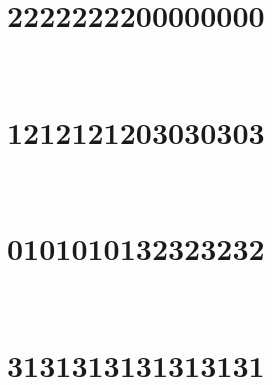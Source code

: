 \marginnote[3\baselineskip]{\centering}



\,
\newline
\vspace{1.2cm}

\section{2222222200000000}

\marginnote[3\baselineskip]{\centering}



\,
\newline
\vspace{1.2cm}

\section{1212121203030303}

\marginnote[3\baselineskip]{\centering}



\,
\newline
\vspace{1.2cm}

\section{0101010132323232}

\marginnote[3\baselineskip]{\centering}



\,
\newline
\vspace{1.2cm}

\section{3131313131313131}

\marginnote[3\baselineskip]{\centering}

